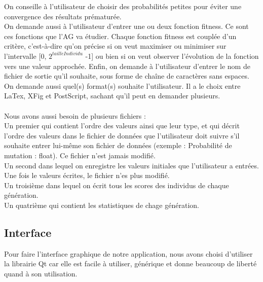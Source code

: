 \documentclass[a4paper,11pt]{article}
\begin{document}
		On conseille à l’utilisateur de choisir des probabilités petites pour éviter une convergence des résultats prématurée.\\
		On demande aussi à l’utilisateur d’entrer une ou deux fonction fitness.
		Ce sont ces fonctions que l’AG va étudier.
		Chaque fonction fitness est couplée d’un critère, c’est-à-dire qu’on précise si on veut maximiser ou minimiser sur l’intervalle [0, $2^{tailleIndividu}$ -1] ou bien si on veut observer l’évolution de la fonction vers une valeur approchée.
		Enfin, on demande à l’utilisateur d’entrer le nom de fichier de sortie qu’il souhaite, sous forme de chaîne de caractères sans espaces.
		On demande aussi quel(s) format(s) souhaite l’utilisateur.
		Il a le choix entre LaTex, XFig et PostScript, sachant qu’il peut en demander plusieurs.\\
		\\
		Nous avons aussi besoin de plusieurs fichiers :\\

		Un premier qui contient l’ordre des valeurs ainsi que leur type, et qui décrit l'ordre des valeurs dans le fichier de données que l'utilisateur doit suivre s'il souhaite entrer lui-même son fichier de données (exemple : Probabilité de mutation : float). Ce fichier n'est jamais modifié.\\
		Un second dans lequel on enregistre les valeurs initiales que l'utilisateur a entrées. Une fois le valeurs écrites, le fichier n'es plus modifié.\\
		Un troisième dans lequel on écrit tous les scores des individus de chaque génération.\\
		Un quatrième qui contient les statistiques de chage génération.\\

		
		\subsection{Interface}
			Pour faire l'interface graphique de notre application, nous avons choisi d'utiliser la librairie Qt car elle est facile à utiliser, générique et donne beaucoup de liberté quand à son utilisation. 
\end{document}
